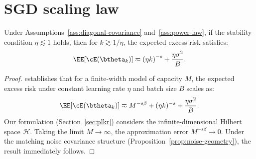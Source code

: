 \documentclass[11pt]{article}
\begin{document}
\section{SGD scaling law}
\label{app:sgd_scaling_law}

\begin{theorem}
\label{thm:sgd_scaling_law}
Under Assumptions~\ref{ass:diagonal-covariance} and~\ref{ass:power-law}, if the stability condition \(\eta\lesssim1\) holds, then for $k \gtrsim 1/\eta$, the expected excess risk satisfies:
\begin{equation}
\label{eq:sgd loss}
\EE[\cE(\btheta_k)]
\eqsim
\left(\eta k\right)^{-s}
+
\frac{\eta\sigma^2}{B}.
\end{equation}
\end{theorem}

\begin{proof}
\citet[Theorem 5.2]{li2026functional} establishes that for a finite-width model of capacity $M$, the expected excess risk under constant learning rate $\eta$ and batch size $B$ scales as:
\[
    \EE[\cE(\btheta_k)] \eqsim M^{-s\beta} + (\eta k)^{-s} + \frac{\eta\sigma^2}{B}.
\]
Our formulation (Section~\ref{sec:plkr}) considers the infinite-dimensional Hilbert space $\mathcal{H}$. Taking the limit $M \to \infty$, the approximation error $M^{-s\beta} \to 0$. Under the matching noise covariance structure (Proposition~\ref{prop:noise-geometry}), the result immediately follows.
\end{proof}









\end{document}
